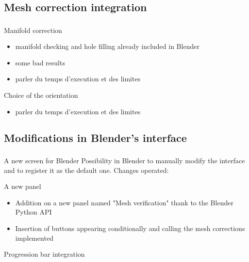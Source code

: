 \documentclass{beamer}
\begin{document}
\subsection{Mesh correction integration}
\begin{frame}
	\frametitle{}

    \begin{block}{Manifold correction}
		\begin{itemize}
			\item manifold checking and hole filling already included in Blender
			\item some bad results
			\item parler du temps d'execution et des limites
		\end{itemize}
    \end{block}
    
    \begin{block}{Choice of the orientation}
		\begin{itemize}
			\item parler du temps d'execution et des limites
		\end{itemize}
    \end{block}
    
\end{frame}

\subsection{Modifications in Blender's interface}
\begin{frame}
	\frametitle{}

    \begin{block}{A new screen for Blender}
Possibility in Blender to manually modify the interface and to register it as the default one.
Changes operated:
    \end{block}
    
    \begin{block}{A new panel}
    \begin{itemize}
	\item Addition on a new panel named "Mesh verification" thank to the Blender Python API
	\item Insertion of buttons appearing conditionally and calling the mesh corrections implemented
	\end{itemize}
    \end{block}
    
    \begin{block}{Progression bar integration}

    \end{block}
    
\end{frame}
\end{document}
